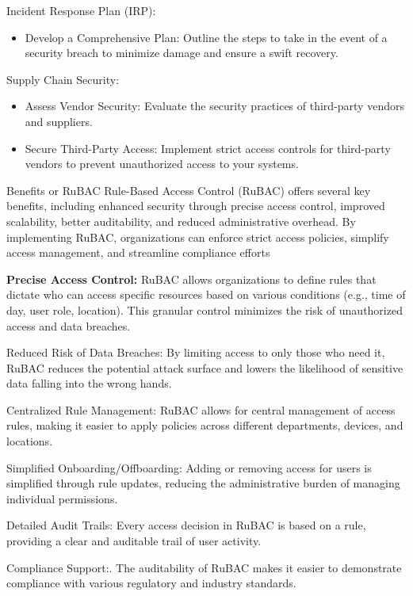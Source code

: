 Incident Response Plan (IRP):
\begin{itemize}
    \item Develop a Comprehensive Plan: Outline the steps to take in the event of a security breach to minimize damage and ensure a swift recovery.
\end{itemize}

Supply Chain Security:
\begin{itemize}
    \item Assess Vendor Security: Evaluate the security practices of third-party vendors and suppliers.
    \item Secure Third-Party Access: Implement strict access controls for third-party vendors to prevent unauthorized access to your systems.
\end{itemize}

Benefits or RuBAC
Rule-Based Access Control (RuBAC) offers several key benefits, including enhanced security through precise access control, improved scalability, better auditability, and reduced administrative overhead. By implementing RuBAC, organizations can enforce strict access policies, simplify access management, and streamline compliance efforts

\textbf{Precise Access Control:}
RuBAC allows organizations to define rules that dictate who can access specific resources based on various conditions (e.g., time of day, user role, location). This granular control minimizes the risk of unauthorized access and data breaches. 

Reduced Risk of Data Breaches:
By limiting access to only those who need it, RuBAC reduces the potential attack surface and lowers the likelihood of sensitive data falling into the wrong hands. 

Centralized Rule Management:
RuBAC allows for central management of access rules, making it easier to apply policies across different departments, devices, and locations. 

Simplified Onboarding/Offboarding:
Adding or removing access for users is simplified through rule updates, reducing the administrative burden of managing individual permissions. 

Detailed Audit Trails:
Every access decision in RuBAC is based on a rule, providing a clear and auditable trail of user activity. 

Compliance Support:.
The auditability of RuBAC makes it easier to demonstrate compliance with various regulatory and industry standards. 

